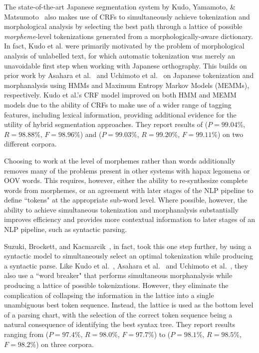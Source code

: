The state-of-the-art Japanese segmentation system by Kudo, Yamamoto, \& Matsumoto~\cite{kudo04} also makes use of CRFs to simultaneously achieve tokenization and morphological analysis by selecting the best path through a lattice of possible \textit{morpheme}-level tokenizations generated from a morphologically-aware dictionary. In fact, Kudo et al. were primarily motivated by the problem of morphological analysis of unlabelled text, for which automatic tokenization was merely an unavoidable first step when working with Japanese orthography. This builds on prior work by Asahara et al.~\cite{asahara00} and Uchimoto et al.~\cite{uchimoto01} on Japanese tokenization and morphanalysis using HMMs and Maximum Entropy Markov Models (MEMMs), respectively. Kudo et al.'s CRF model improved on both HMM and MEMM models due to the ability of CRFs to make use of a wider range of tagging features, including lexical information, providing additional evidence for the utility of hybrid segmentation approaches. They report results of ($P = 99.04\%$, $R = 98.88\%$, $F = 98.96\%$) and ($P = 99.03\%$, $R = 99.20\%$, $F = 99.11\%$) on two different corpora.

Choosing to work at the level of morphemes rather than words additionally removes many of the problems present in other systems with hapax legomena or OOV words. This requires, however, either the ability to re-synthesize complete words from morphemes, or an agreement with later stages of the NLP pipeline to define ``tokens" at the appropriate sub-word level. Where possible, however, the ability to achieve simultaneous tokenization and morphanalysis substantially improves efficiency and provides more contextual information to later stages of an NLP pipeline, such as syntactic parsing.

Suzuki, Brockett, and Kacmarcik~\cite{suzuki00}, in fact, took this one step further, by using a syntactic model to simultaneously select an optimal tokenization while producing a syntactic parse. Like Kudo et al.~\cite{kudo04}, Asahara et al.~\cite{asahara00} and Uchimoto et al.~\cite{uchimoto01}, they also use a ``word breaker" that performs simultaneous morphanalysis while producing a lattice of possible tokenizations. However, they eliminate the complication of collapsing the information in the lattice into a single unambiguous best token sequence. Instead, the lattice is used as the bottom level of a parsing chart, with the selection of the correct token sequence being a natural consequence of identifying the best syntax tree. They report results ranging from ($P = 97.4\%$, $R = 98.0\%$, $F = 97.7\%$) to ($P = 98.1\%$, $R = 98.5\%$, $F = 98.2\%$) on three corpora.

